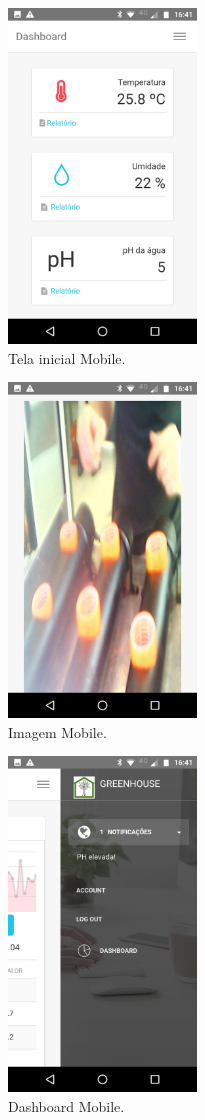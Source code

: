 	
	\begin{figure}[H]
		\centering
		\includegraphics[width=5cm]{figuras/sensorMob.jpeg}
		\caption{Tela inicial Mobile.}
		\label{sensorMob}
	\end{figure}

	\begin{figure}[H]
		\centering
		\includegraphics[width=5cm]{figuras/imagMob.jpeg}
		\caption{Imagem Mobile.}
		\label{imagMob}
	\end{figure}
	
	\begin{figure}[H]
		\centering
		\includegraphics[width=5cm]{figuras/dashMob.jpeg}
		\caption{Dashboard Mobile.}
		\label{dashMob}
	\end{figure}
	
